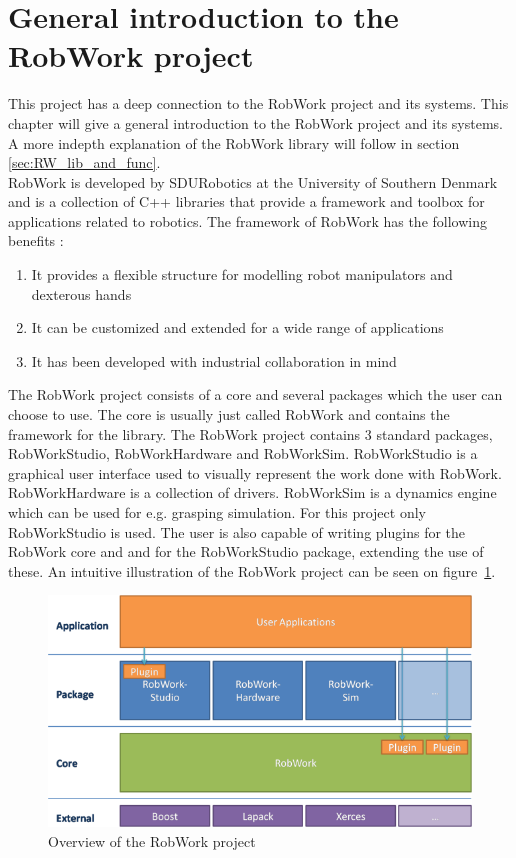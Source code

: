 \section{General introduction to the RobWork project}
\label{sec:generalIntroductionToTheRobWorkProject}
This project has a deep connection to the RobWork project and its systems. This chapter will give a general introduction to the RobWork project and its systems. A more indepth explanation of the RobWork library will follow in section \ref{sec:RW_lib_and_func}.\\

RobWork is developed by SDURobotics at the University of Southern Denmark and is a collection of C++ libraries \cite{RW_Webpage} that provide a framework and toolbox for applications related to robotics. The framework of RobWork has the following benefits \cite{RW_Toolbox_Framework}:

\begin{enumerate}
	\item It provides a flexible structure for modelling robot manipulators and dexterous hands
	\item It can be customized and extended for a wide range of applications
	\item It has been developed with industrial collaboration in mind
\end{enumerate}

The RobWork project consists of a core and several packages which the user can choose to use. The core is usually just called RobWork and contains the framework for the library. The RobWork project contains 3 standard packages, RobWorkStudio, RobWorkHardware and RobWorkSim. RobWorkStudio is a graphical user interface used to visually represent the work done with RobWork. RobWorkHardware is a collection of drivers. RobWorkSim is a dynamics engine which can be used for e.g. grasping simulation. For this project only RobWorkStudio is used. The user is also capable of writing plugins for the RobWork core and and for the RobWorkStudio package, extending the use of these. An intuitive illustration of the RobWork project can be seen on figure~\ref{fig:RWOverview}.

\begin{figure}[h]
	\centering
	\includegraphics[scale=1]{Figures/RWOverview.png}
	\caption{Overview of the RobWork project \cite{RW_Overview}}
	\label{fig:RWOverview}
\end{figure}